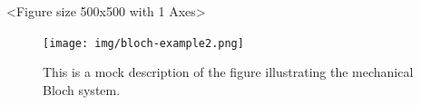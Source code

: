 
  \begin{result}
  <Figure size 500x500 with 1 Axes>
  \end{result}

\begin{figure}[h!]
  \centering
  \texttt{[image: img/bloch-example2.png]}
  \caption{This is a mock description of the figure illustrating the mechanical Bloch system.}
  \label{fig:mechanical_bloch}
\end{figure}

